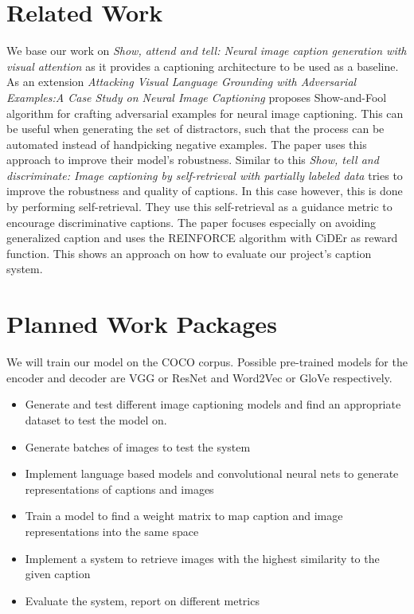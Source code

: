 \documentclass[12pt]{article}
\begin{document}
\section{Related Work}

We base our work on \textit{Show, attend and tell: Neural image caption generation with visual attention} \cite{xu2015show} as it provides a captioning architecture to be used as a baseline.
As an extension \textit{Attacking Visual Language Grounding with Adversarial Examples:A Case Study on Neural Image Captioning} \cite{chen2017attacking} proposes Show-and-Fool algorithm for crafting adversarial examples for neural image captioning. This can be useful when generating the set of distractors, such that the process can be automated instead of handpicking negative examples. The paper uses this approach to improve their model’s robustness.
Similar to this \textit{Show, tell and discriminate: Image captioning by self-retrieval with partially labeled data} \cite{liu2018show}  tries to improve the robustness and quality of captions. In this case however, this is done by performing self-retrieval. They use this self-retrieval as a guidance metric to encourage discriminative captions. The paper focuses especially on avoiding generalized caption and uses the REINFORCE algorithm with CiDEr as reward function. This shows an approach on how to evaluate our project’s caption system.

\section{Planned Work Packages}

We will train our model on the COCO corpus.
Possible pre-trained models for the encoder and decoder are VGG or ResNet and Word2Vec or GloVe respectively.

\begin{itemize}
    \item Generate and test different image captioning models and find an appropriate dataset to test the model on.
    \item Generate batches of images to test the system
    \item Implement language based models and convolutional neural nets to generate representations of captions and images
    \item Train a model to find a weight matrix to map caption and image representations  into the same space
    \item Implement a system to retrieve images with the highest similarity to the given caption
    \item Evaluate the system, report on different metrics
\end{itemize}

\newpage

 

\end{document}
